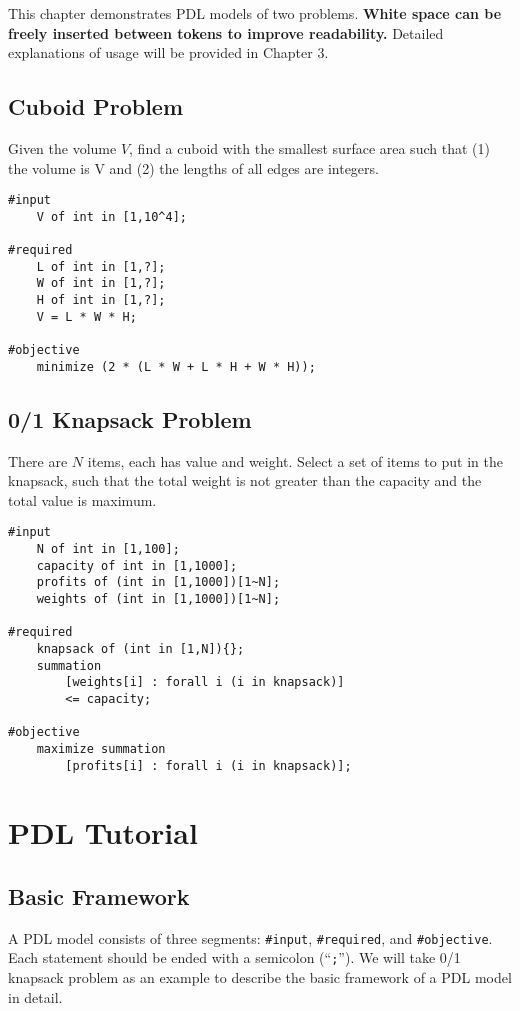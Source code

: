 \documentclass{report}
\begin{document}
This chapter demonstrates PDL models of two problems. \textbf{White space can be freely inserted between tokens to improve readability.} Detailed explanations of usage will be provided in Chapter 3.

\section{Cuboid Problem}

Given the volume $V$, find a cuboid with the smallest surface area such that (1) the volume is V and (2) the lengths of all edges are integers.

\begin{lstlisting}
#input
	V of int in [1,10^4];

#required
	L of int in [1,?];
	W of int in [1,?];
	H of int in [1,?];
	V = L * W * H;

#objective
	minimize (2 * (L * W + L * H + W * H));
\end{lstlisting}

\section{0/1 Knapsack Problem}

There are $N$ items, each has value and weight. Select a set of items to put in the knapsack, such that the total weight is not greater than the capacity and the total value is maximum.

\begin{lstlisting}
#input
	N of int in [1,100];
	capacity of int in [1,1000];
	profits of (int in [1,1000])[1~N];
	weights of (int in [1,1000])[1~N];
	
#required
	knapsack of (int in [1,N]){};
	summation
	    [weights[i] : forall i (i in knapsack)] 
	    <= capacity;
	    
#objective
	maximize summation
	    [profits[i] : forall i (i in knapsack)];
\end{lstlisting}

\chapter{PDL Tutorial}

\section{Basic Framework}

A PDL model consists of three segments: \texttt{\#input}, \texttt{\#required}, and \texttt{\#objective}. Each statement should be ended with a semicolon (``\texttt{;}''). We will take 0/1 knapsack problem as an example to describe the basic framework of a PDL model in detail.
\end{document}
